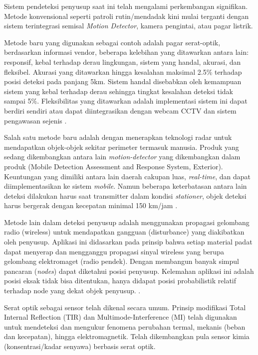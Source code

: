 \documentclass[12pt]{article}
\begin{document}
	Sistem pendeteksi penyusup saat ini telah mengalami perkembangan signifikan.
	Metode konvensional seperti patroli rutin/mendadak kini mulai terganti dengan sistem terintegrasi semisal \textit{Motion Detector}, kamera pengintai, atau pagar listrik.
	
	Metode baru yang digunakan sebagai contoh adalah pagar serat-optik, berdasarkan informasi vendor, beberapa kelebihan yang ditawarkan antara lain: responsif, kebal terhadap derau lingkungan, sistem yang handal, akurasi, dan fleksibel.
	Akurasi yang ditawarkan hingga kesalahan maksimal 2.5\% terhadap posisi deteksi pada panjang 5km.
	Sistem handal disebabkan oleh kemampuan sistem yang kebal terhadap derau sehingga tingkat kesalahan deteksi tidak sampai 5\%.
	Fleksibilitas yang ditawarkan adalah implementasi sistem ini dapat berdiri sendiri atau dapat diintegrasikan dengan webcam CCTV dan sistem pengawasan sejenis \cite{AFL2011}.
	
	Salah satu metode baru adalah dengan menerapkan teknologi radar untuk mendapatkan objek-objek sekitar perimeter termasuk manusia. 
	Produk yang sedang dikembangkan antara lain \textit{motion-detector} yang dikembangkan dalam produk (Mobile Detection Assessment and Response System, Exterior).
	Keuntungan yang dimiliki antara lain daerah cakupan luas, \textit{real-time}, dan dapat diimplementasikan ke sistem \textit{mobile}.
	Namun beberapa keterbatasan antara lain deteksi dilakukan harus saat transmitter dalam kondisi \textit{stationer}, objek deteksi harus bergerak dengan kecepatan minimal 150 km/jam \cite{Cory1998}.

	Metode lain dalam deteksi penyusup adalah menggunakan propagasi gelombang radio (wireless) untuk mendapatkan gangguan (disturbance) yang diakibatkan oleh penyusup.
	Aplikasi ini didasarkan pada prinsip bahwa setiap material padat dapat menyerap dan mengganggu propagasi sinyal wireless yang berupa gelombang elektromaget (radio pendek).
	Dengan membangun banyak simpul pancaran (\textit{nodes}) dapat diketahui posisi penyusup.
	Kelemahan aplikasi ini adalah posisi eksak tidak bisa ditentukan, hanya didapat posisi probabilistik relatif terhadap node yang dekat objek penyusup. \cite{Elmorsy}\cite{Elmorsy2014}.
	
	Serat optik sebagai sensor telah dikenal secara umum.
	Prinsip modifikasi Total Internal Reflection (TIR) dan Multimode-Interference (MI) telah digunakan untuk mendeteksi dan mengukur fenomena perubahan termal, mekanis (beban dan kecepatan), hingga elektromagnetik.
	Telah dikembangkan pula sensor kimia (konsentrasi/kadar senyawa) berbasis serat optik.
	
\end{document}
